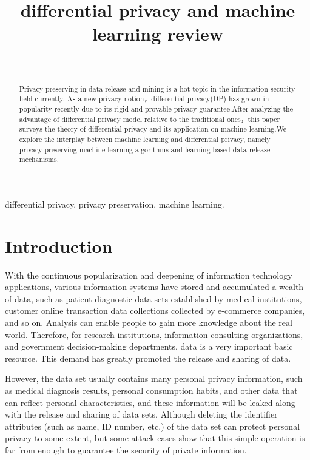 \documentclass[10pt,conference]{IEEEtran}
\begin{document}
\title{differential privacy and machine learning review}

\author{\\
}


\maketitle

\begin{abstract}
Privacy preserving in data release and mining is a hot topic in the information security field currently.
As a new privacy notion，differential privacy(DP) has grown in popularity recently due to its rigid and provable privacy guarantee.After analyzing the advantage of differential privacy model relative to the traditional ones，this paper surveys the theory of differential privacy and its application on machine learning.We explore the interplay between machine learning and differential privacy, namely privacy-preserving machine learning algorithms and learning-based data release mechanisms. 
\end{abstract}

\begin{IEEEkeywords}
differential privacy, privacy preservation, machine learning.
\end{IEEEkeywords}

\IEEEpeerreviewmaketitle


\section{Introduction}
\label{sec:introduction}

With the continuous popularization and deepening of information technology applications, various information systems have stored and accumulated a wealth of data, such as patient diagnostic data sets established by medical institutions, customer online transaction data collections collected by e-commerce companies, and so on. Analysis can enable people to gain more knowledge about the real world. Therefore, for research institutions, information consulting organizations, and government decision-making departments, data is a very important basic resource. This demand has greatly promoted the release and sharing of data. 

However, the data set usually contains many personal privacy information, such as medical diagnosis results, personal consumption habits, and other data that can reflect personal characteristics, and these information will be leaked along with the release and sharing of data sets. Although deleting the identifier attributes (such as name, ID number, etc.) of the data set can protect personal privacy to some extent, but some attack cases show that this simple operation is far from enough to guarantee the security of private information.
\end{document}

